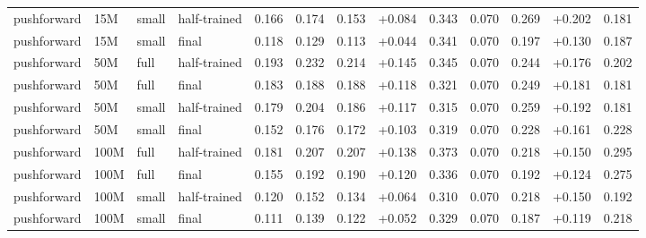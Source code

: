 \begin{tabular*}{\textwidth}{@{\extracolsep{\fill}}llllccccccccc@{}}
pushforward & 15M & small & half-trained & 0.166 & 0.174 & 0.153 & +0.084 & 0.343 & 0.070 & 0.269 & +0.202 & 0.181 \\
pushforward & 15M & small & final & 0.118 & 0.129 & 0.113 & +0.044 & 0.341 & 0.070 & 0.197 & +0.130 & 0.187 \\
pushforward & 50M & full & half-trained & 0.193 & 0.232 & 0.214 & +0.145 & 0.345 & 0.070 & 0.244 & +0.176 & 0.202 \\
pushforward & 50M & full & final & 0.183 & 0.188 & 0.188 & +0.118 & 0.321 & 0.070 & 0.249 & +0.181 & 0.181 \\
pushforward & 50M & small & half-trained & 0.179 & 0.204 & 0.186 & +0.117 & 0.315 & 0.070 & 0.259 & +0.192 & 0.181 \\
pushforward & 50M & small & final & 0.152 & 0.176 & 0.172 & +0.103 & 0.319 & 0.070 & 0.228 & +0.161 & 0.228 \\
pushforward & 100M & full & half-trained & 0.181 & 0.207 & 0.207 & +0.138 & 0.373 & 0.070 & 0.218 & +0.150 & 0.295 \\
pushforward & 100M & full & final & 0.155 & 0.192 & 0.190 & +0.120 & 0.336 & 0.070 & 0.192 & +0.124 & 0.275 \\
pushforward & 100M & small & half-trained & 0.120 & 0.152 & 0.134 & +0.064 & 0.310 & 0.070 & 0.218 & +0.150 & 0.192 \\
pushforward & 100M & small & final & 0.111 & 0.139 & 0.122 & +0.052 & 0.329 & 0.070 & 0.187 & +0.119 & 0.218 \\
\bottomrule
\end{tabular*}
